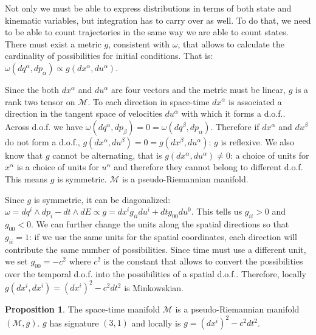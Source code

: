 \documentclass[aps,pra,10pt,twocolumn,floatfix,nofootinbib]{revtex4-1}
\numberwithin{equation}{section}
\theoremstyle{definition}
\newtheorem{prop}[equation]{Proposition}
\begin{document}
Not only we must be able to express distributions in terms of both state and kinematic variables, but integration has to carry over as well. To do that, we need to be able to count trajectories in the same way we are able to count states. There must exist a metric $g$, consistent with $\omega$, that allows to calculate the cardinality of possibilities for initial conditions. That is: $\omega(dq^\alpha,dp_\alpha) \propto g(dx^\alpha,du^\alpha)$.

Since the both $dx^\alpha$ and $du^\alpha$ are four vectors and the metric must be linear, $g$ is a rank two tensor on $\mathcal{M}$. To each direction in space-time $dx^\alpha$ is associated a direction in the tangent space of velocities $du^\alpha$ with which it forms a d.o.f.. Across d.o.f. we have $\omega(dq^\alpha, dp_\beta) = 0 =\omega(dq^\beta, dp_\alpha)$. Therefore if $dx^\alpha$ and $du^\beta$ do not form a d.o.f., $g(dx^\alpha, du^\beta) = 0 = g(dx^\beta, du^\alpha)$: $g$ is reflexive. We also know that $g$ cannot be alternating, that is $g(dx^\alpha, du^\alpha) \neq 0$: a choice of units for $x^\alpha$ is a choice of units for $u^\alpha$ and therefore they cannot belong to different d.o.f. This means $g$ is symmetric. $\mathcal{M}$ is a pseudo-Riemannian manifold.

Since $g$ is symmetric, it can be diagonalized: $\omega= dq^i \wedge dp_i - dt \wedge dE \propto g = dx^i g_{ii} du^i + dt g_{00} du^0$. This tells us $g_{ii} > 0$ and $g_{00} < 0$. We can further change the units along the spatial directions so that $g_{ii}=1$: if we use the same units for the spatial coordinates, each direction will contribute the same number of possibilities. Since time must use a different unit, we set $g_{00}=-c^2$ where $c^2$ is the constant that allows to convert the possibilities over the temporal d.o.f. into the possibilities of a spatial d.o.f.. Therefore, locally $g(dx^i, dx^i) = (dx^i)^2 - c^2 dt^2$ is Minkowskian.

\begin{prop}\label{riemannian_manifold}
	The space-time manifold $\mathcal{M}$ is a pseudo-Riemannian manifold $(\mathcal{M}, g)$. $g$ has signature $(3,1)$ and locally is $g = (dx^i)^2 - c^2 dt^2$.
\end{prop}
\end{document}
